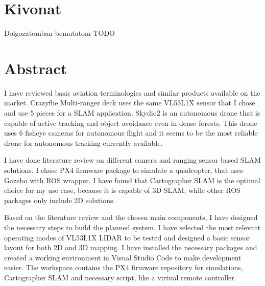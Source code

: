 \setcounter{page}{1}

\selecthungarian

\chapter*{Kivonat}
Dolgozatomban bemutatom TODO


\vfill
\selectenglish


\chapter*{Abstract}

I have reviewed basic aviation terminologies and similar products available on the market.
Crazyflie Multi-ranger deck uses the same VL53L1X sensor that I chose and use 5 pieces for a SLAM application.
Skydio2 is an autonomous drone that is capable of active tracking and object avoidance even in dense 
forests. This drone uses 6 fisheye cameras for autonomous flight and it seems to be the most reliable 
drone for autonomous tracking currently available.

I have done literature review on different camera and ranging sensor based SLAM solutions. I chose PX4 
firmware package to simulate a quadcopter, that uses Gazebo with ROS wrapper. I have found that Cartographer 
SLAM is the optimal choice for my use case, because it is capable of 3D SLAM, while other ROS packages only 
include 2D solutions.

Based on the literature review and the chosen main components, I have designed the necessary steps to
build the planned system. I have selected the most relevant operating modes of VL53L1X LIDAR to be tested
and designed a basic sensor layout for both 2D and 3D mapping. I have installed the necessary packages and
created a working environment in Visual Studio Code to make development easier. The workspace contains 
the PX4 firmware repository for simulations, Cartographer SLAM and necessary script, like a virtual remote
controller.


